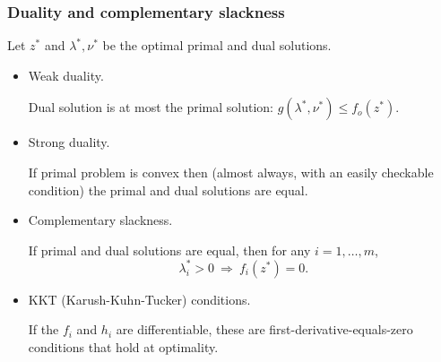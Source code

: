 \documentclass[smaller]{beamer}
\def\darkred{\color{red!70!black}}
\def\darkgreen{\color{green!60!black}}
\begin{document}
\begin{frame}
\frametitle{Duality and complementary slackness}

{\darkgreen Let $z^*$ and $\lambda^*, \nu^*$ be the optimal primal and dual solutions.}

\begin{itemize}
\item<2-> {\darkred Weak duality.}

Dual solution is at most the primal solution: $g(\lambda^*, \nu^*) \leq f_o(z^*)$.

\item<3-> {\darkred Strong duality.}

If primal problem is convex then (almost always, with an easily checkable condition) the primal and dual solutions are equal.

\item<4-> {\darkred Complementary slackness.}

If primal and dual solutions are equal, then for any $i = 1, \ldots, m$,
$$ \lambda_i^* > 0 \ \Rightarrow \ f_i(z^*) = 0 .$$

\item<5-> {\darkred KKT (Karush-Kuhn-Tucker) conditions.}

If the $f_i$ and $h_i$ are differentiable, these are first-derivative-equals-zero conditions that hold at optimality.


\end{itemize}

\end{frame}
\end{document}
